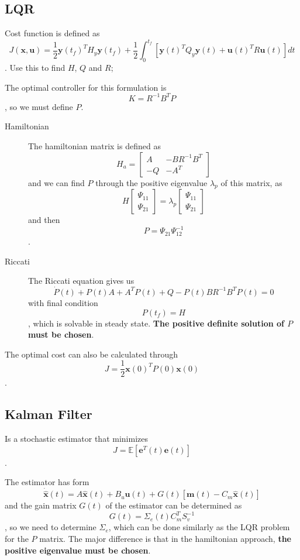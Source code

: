\documentclass[a4paper]{report}
\begin{document}
\subsection*{LQR}

Cost function is defined as \[
    J(\bm{x}, \bm{u}) = \frac{1}{2}\bm{y}(t_f)^{T}H_y \bm{y}(t_f) + \frac{1}{2}\int_0^{t_f}\left[ \bm{y}(t)^{T}Q_y \bm{y}(t)  +  \bm{u}(t)^{T}R\bm{u}(t) \right] dt
\]. Use this to find $H$, $Q$ and $R$;

The optimal controller for this formulation is \[
K = R^{-1}B^{T}P
\], so we must define $P$.

 \begin{description}
    \item[Hamiltonian] The hamiltonian matrix is defined as \[
H_a = \begin{bmatrix} A & -BR^{-1}B^{T} \\ -Q & -A^{T} \end{bmatrix}
    \] and we can find $P$ through the positive eigenvalue $\lambda_p$ of this matrix, as \[
    H\begin{bmatrix} \Psi_{11} \\ \Psi_{21} \end{bmatrix} = \lambda_p\begin{bmatrix} \Psi_{11} \\ \Psi_{21} \end{bmatrix}
    \] and then \[
    P = \Psi_{21}\Psi_{12}^{-1}
    \].
    \item[Riccati] The Riccati equation gives us \[
    \dot{P}(t) + P(t)A + A^{T}P(t) + Q - P(t)BR^{-1}B^{T}P(t) = 0
    \] with final condition \[
    P(t_f) = H
    \], which is solvable in steady state. \textbf{The positive definite solution of $P$ must be chosen}.
\end{description}

The optimal cost can also be calculated through \[
    J = \frac{1}{2}\bm{x}(0)^{T}P(0)\bm{x}(0)
\].

\subsection*{Kalman Filter}

Is a stochastic estimator that minimizes \[
J = \mathbb{E}\left[ \bm{e}^{T}(t)\bm{e}(t) \right]
\].

The estimator has form \[
\dot{\bm{\hat{x}}}(t) = A\bm{\hat{x}}(t) + B_u\bm{u}(t) + G(t)\left[ \bm{m}(t) - C_m\bm{\hat{x}}(t) \right] 
\] and the gain matrix $G(t)$ of the estimator can be determined as \[
G(t) = \Sigma_e(t)C_m^{T}S_v^{-1}
\], so we need to determine $\Sigma_e$, which can be done similarly as the LQR problem for the $P$ matrix. The major difference is that in the hamiltonian approach, \textbf{the positive eigenvalue must be chosen}.
\end{document}
